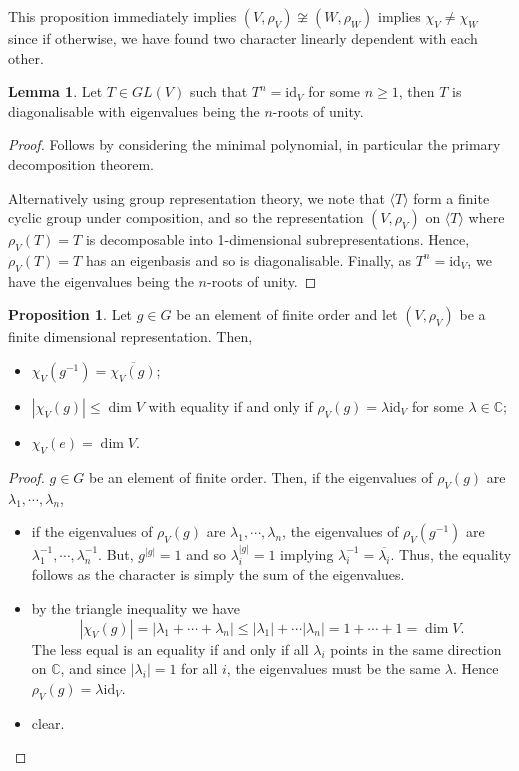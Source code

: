 \documentclass[]{article}
\theoremstyle{definition}
\theoremstyle{definition}
\newtheorem{lemma}{Lemma}[section]
\newtheorem{proposition}{Proposition}[section]
\begin{document}
This proposition immediately implies \((V, \rho_V) \not\cong (W, \rho_W)\) 
implies \(\chi_V \neq \chi_W\) since if otherwise, we have found two character 
linearly dependent with each other.

\begin{lemma}
  Let \(T \in GL(V)\) such that \(T^n = \text{id}_V\) for some \(n \ge 1\), 
  then \(T\) is diagonalisable with eigenvalues being the \(n\)-roots of unity.
\end{lemma}
\begin{proof}
  Follows by considering the minimal polynomial, in particular the primary 
  decomposition theorem.

  Alternatively using group representation theory, we note that 
  \(\langle T \rangle\) form a finite cyclic group under composition, and 
  so the representation \((V, \rho_V)\) on \(\langle T \rangle\) where 
  \(\rho_V(T) = T\) is decomposable into 1-dimensional subrepresentations. 
  Hence, \(\rho_V(T) = T\) has an eigenbasis and so is diagonalisable. 
  Finally, as \(T^n = \text{id}_V\), we have the 
  eigenvalues being the \(n\)-roots of unity.
\end{proof}

\begin{proposition}
  Let \(g \in G\) be an element of finite order and let \((V, \rho_V)\) be a 
  finite dimensional representation. Then, 
  \begin{itemize}
    \item \(\chi_V(g^{-1}) = \overline{\chi_V(g)}\);
    \item \(|\chi_V(g)| \le \dim V\) with equality if and only if 
      \(\rho_V(g) = \lambda \text{id}_V\) for some \(\lambda \in \mathbb{C}\);
    \item \(\chi_V(e) = \dim V\).
  \end{itemize}
\end{proposition}
\begin{proof}
  \(g \in G\) be an element of finite order. Then, if the eigenvalues of 
  \(\rho_V(g)\) are \(\lambda_1, \cdots, \lambda_n\), 
  \begin{itemize}
    \item if the eigenvalues of \(\rho_V(g)\) are \(\lambda_1, \cdots, \lambda_n\), 
      the eigenvalues of \(\rho_V(g^{-1})\) are 
      \(\lambda_1^{-1}, \cdots, \lambda_n^{-1}\). But, \(g^{|g|} = 1\) and so 
      \(\lambda_i^{|g|} = 1\) implying \(\lambda_i^{-1} = \overline{\lambda_i}\).
      Thus, the equality follows as the character is simply the sum of the eigenvalues. 
    \item by the triangle inequality we have 
      \[|\chi_V(g)| = |\lambda_1 + \cdots + \lambda_n| \le 
        |\lambda_1| + \cdots |\lambda_n| = 1 + \cdots + 1 = \dim V.\]
      The less equal is an equality if and only if all \(\lambda_i\) points in the 
      same direction on \(\mathbb{C}\), and since \(|\lambda_i| = 1\) for all \(i\), 
      the eigenvalues must be the same \(\lambda\). Hence 
      \(\rho_V(g) = \lambda \text{id}_V\).
    \item clear.
  \end{itemize}
\end{proof}
\end{document}
